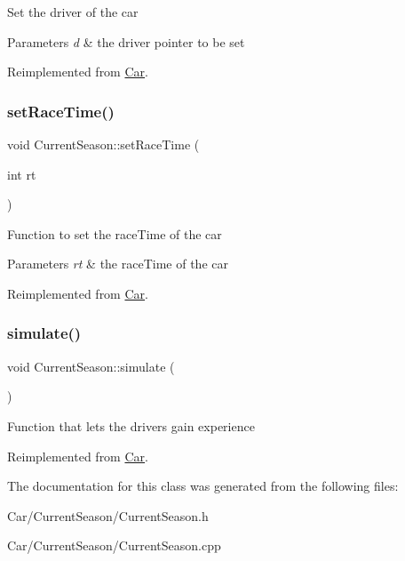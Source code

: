 Set the driver of the car 
\begin{DoxyParams}{Parameters}
{\em d} & the driver pointer to be set \\
\hline
\end{DoxyParams}


Reimplemented from \hyperlink{classCar_ad7148bd1abe107ce2e2b134f78582c9d}{Car}.

\mbox{\label{classCurrentSeason_aae01cbd64006ce4fe60ea337b4f02962}} 
\subsubsection{\texorpdfstring{set\+Race\+Time()}{setRaceTime()}}
{\footnotesize\ttfamily void Current\+Season\+::set\+Race\+Time (\begin{DoxyParamCaption}\item[{int}]{rt }\end{DoxyParamCaption})\hspace{0.3cm}{\ttfamily [virtual]}}

Function to set the race\+Time of the car 
\begin{DoxyParams}{Parameters}
{\em rt} & the race\+Time of the car \\
\hline
\end{DoxyParams}


Reimplemented from \hyperlink{classCar}{Car}.

\mbox{\label{classCurrentSeason_a4828aaa2c0b914b55ebb34c0d1062e8e}} 
\subsubsection{\texorpdfstring{simulate()}{simulate()}}
{\footnotesize\ttfamily void Current\+Season\+::simulate (\begin{DoxyParamCaption}{ }\end{DoxyParamCaption})\hspace{0.3cm}{\ttfamily [virtual]}}

Function that lets the drivers gain experience 

Reimplemented from \hyperlink{classCar}{Car}.



The documentation for this class was generated from the following files\+:\begin{DoxyCompactItemize}
\item 
Car/\+Current\+Season/Current\+Season.\+h\item 
Car/\+Current\+Season/Current\+Season.\+cpp\end{DoxyCompactItemize}
